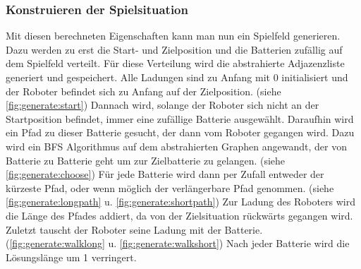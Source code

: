 \documentclass[a4paper,10pt,ngerman]{scrartcl}
\begin{document}
\subsubsection{Konstruieren der Spielsituation}
Mit diesen berechneten Eigenschaften kann man nun ein Spielfeld generieren.
Dazu werden zu erst die Start- und Zielposition und die Batterien zufällig auf dem Spielfeld verteilt.
Für diese Verteilung wird die abstrahierte Adjazenzliste generiert und gespeichert.
Alle Ladungen sind zu Anfang mit 0 initialisiert und der Roboter befindet sich zu Anfang auf der Zielposition.
(siehe \ref{fig:generate:start})
Dannach wird, solange der Roboter sich nicht an der Startposition befindet, immer eine zufällige Batterie ausgewählt.
Daraufhin wird ein Pfad zu dieser Batterie gesucht, der dann vom Roboter gegangen wird.
Dazu wird ein BFS Algorithmus auf dem abstrahierten Graphen angewandt, der von Batterie zu Batterie geht um zur Zielbatterie zu gelangen.
(siehe \ref{fig:generate:choose})
Für jede Batterie wird dann per Zufall entweder der kürzeste Pfad, oder wenn möglich der verlängerbare Pfad genommen.
(siehe \ref{fig:generate:longpath} u. \ref{fig:generate:shortpath})
Zur Ladung des Roboters wird die Länge des Pfades addiert, da von der Zielsituation rückwärts gegangen wird.
Zuletzt tauscht der Roboter seine Ladung mit der Batterie.
(\ref{fig:generate:walklong} u. \ref{fig:generate:walkshort})
Nach jeder Batterie wird die Lösungslänge um 1 verringert.
\end{document}

